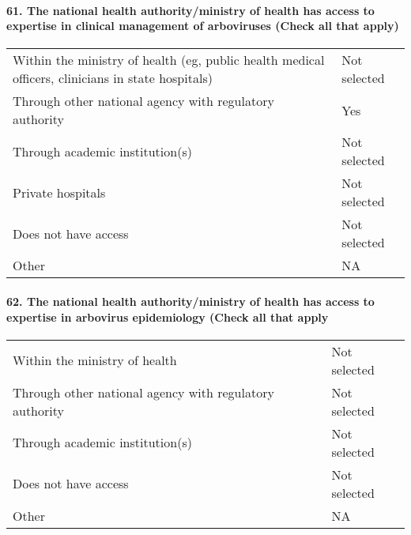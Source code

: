 \documentclass[
]{article}
\begin{document}
\hypertarget{the-national-health-authorityministry-of-health-has-access-to-expertise-in-clinical-management-of-arboviruses-check-all-that-apply}{%
\paragraph{61. The national health authority/ministry of health has
access to expertise in clinical management of arboviruses (Check all
that
apply)}\label{the-national-health-authorityministry-of-health-has-access-to-expertise-in-clinical-management-of-arboviruses-check-all-that-apply}}

\begin{longtable}[]{@{}
  >{\raggedright\arraybackslash}p{}
  >{\raggedright\arraybackslash}p{}@{}}
\toprule
\endhead
Within the ministry of health (eg, public health medical officers,
clinicians in state hospitals) & Not selected \\
Through other national agency with regulatory authority & Yes \\
Through academic institution(s) & Not selected \\
Private hospitals & Not selected \\
Does not have access & Not selected \\
Other & NA \\
\bottomrule
\end{longtable}

\hypertarget{the-national-health-authorityministry-of-health-has-access-to-expertise-in-arbovirus-epidemiology-check-all-that-apply}{%
\paragraph{62. The national health authority/ministry of health has
access to expertise in arbovirus epidemiology (Check all that
apply}\label{the-national-health-authorityministry-of-health-has-access-to-expertise-in-arbovirus-epidemiology-check-all-that-apply}}

\begin{longtable}[]{@{}ll@{}}
\toprule
\endhead
Within the ministry of health & Not selected \\
Through other national agency with regulatory authority & Not
selected \\
Through academic institution(s) & Not selected \\
Does not have access & Not selected \\
Other & NA \\
\bottomrule
\end{longtable}
\end{document}
